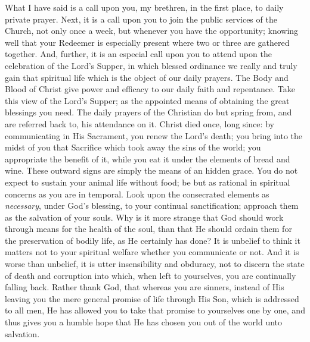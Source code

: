 What I have said is a call upon you, my brethren, in
the first place, to daily private prayer. Next, it is a
call upon you to join the public services of the Church,
not only once a week, but whenever you have the
opportunity; knowing well that your Redeemer is
especially present where two or three are gathered
together. And, further, it is an especial call upon you
to attend upon the celebration of the Lord's Supper, in
which blessed ordinance we really and truly gain that
spiritual life which is the object of our daily prayers.
The Body and Blood of Christ give power and efficacy to
our daily faith and repentance. Take this view of the
Lord's Supper; as the appointed means of obtaining the
great blessings you need. The daily prayers of the
Christian do but spring from, and are referred back to,
his attendance on it. Christ died once, long since: by
communicating in His Sacrament, you renew the Lord's
death; you bring into the midst of you that Sacrifice
which took away the sins of the world; you appropriate
the benefit of it, while you eat it under the elements of
bread and wine. These outward signs are simply the means
of an hidden grace. You do not expect to sustain your
animal life without food; be but as rational in spiritual
concerns as you are in temporal. Look upon the
consecrated elements as \emph{necessary}, under God's
blessing, to your continual sanctification; approach them
as the salvation of your souls. Why is it more strange
that God should work through means for the health of the
soul, than that He should ordain them for the
preservation of bodily life, as He certainly has done? It
is unbelief to think it matters not to your spiritual
welfare whether you communicate or not. And it is worse
than unbelief, it is utter insensibility and obduracy,
not to discern the state of death and corruption into
which, when left to yourselves, you are continually
falling back. Rather thank God, that whereas you are
sinners, instead of His leaving you the mere general
promise of life through His Son, which is addressed to
all men, He has allowed you to take that promise to
yourselves one by one, and thus gives you a humble hope
that He has chosen you out of the world unto salvation.

